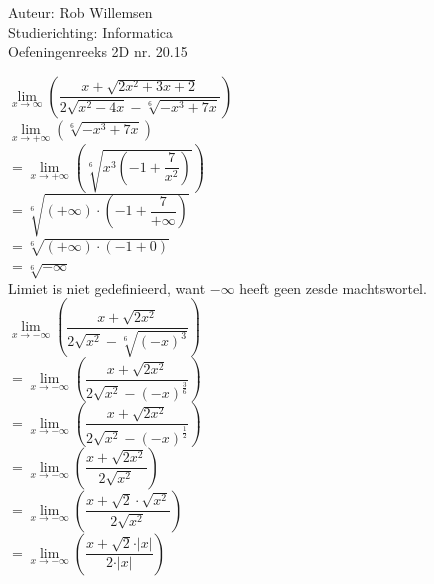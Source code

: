 \documentclass[a4paper]{article}
\begin{document}
\noindent \large Auteur: Rob Willemsen \\
\noindent \large Studierichting: Informatica\\
\noindent \large Oefeningenreeks 2D nr. 20.15\\

\medskip

\normalsize

$\lim\limits_{x \rightarrow \infty} \left(\dfrac{x + \sqrt{2x^2 + 3x + 2}}{2\sqrt{x^2 - 4x} - \sqrt[6]{-x^3 + 7x}}\right)$ \\

$\lim\limits_{x \rightarrow +\infty} \left(\sqrt[6]{-x^3 + 7x}\right)$ \\

$= \lim\limits_{x \rightarrow +\infty} \left(\sqrt[6]{x^3 \left(-1 + \dfrac{7}{x^2}\right)}\right)$ \\

$= \sqrt[6]{(+\infty) \cdot \left(-1 + \dfrac{7}{+\infty}\right)}$ \\

$= \sqrt[6]{(+\infty) \cdot \left(-1 + 0\right)}$ \\

$= \sqrt[6]{-\infty}$ \\

Limiet is niet gedefinieerd, want $-\infty$ heeft geen zesde machtswortel. \\

$\lim\limits_{x \rightarrow -\infty} \left(\dfrac{x + \sqrt{2x^2}}{2\sqrt{x^2} - \sqrt[6]{(-x)^3}}\right)$ \\

$= \lim\limits_{x \rightarrow -\infty} \left(\dfrac{x + \sqrt{2x^2}}{2\sqrt{x^2} - (-x)^{\tfrac{3}{6}}}\right)$ \\

$= \lim\limits_{x \rightarrow -\infty} \left(\dfrac{x + \sqrt{2x^2}}{2\sqrt{x^2} - (-x)^{\tfrac{1}{2}}}\right)$ \\

$= \lim\limits_{x \rightarrow -\infty} \left(\dfrac{x + \sqrt{2x^2}}{2\sqrt{x^2}}\right)$ \\

$= \lim\limits_{x \rightarrow -\infty} \left(\dfrac{x + \sqrt{2} \cdot \sqrt{x^2}}{2\sqrt{x^2}}\right)$ \\

$= \lim\limits_{x \rightarrow -\infty} \left(\dfrac{x + \sqrt{2} \cdot \vert x \vert}{2 \cdot \vert x \vert}\right)$ \\
\end{document}

